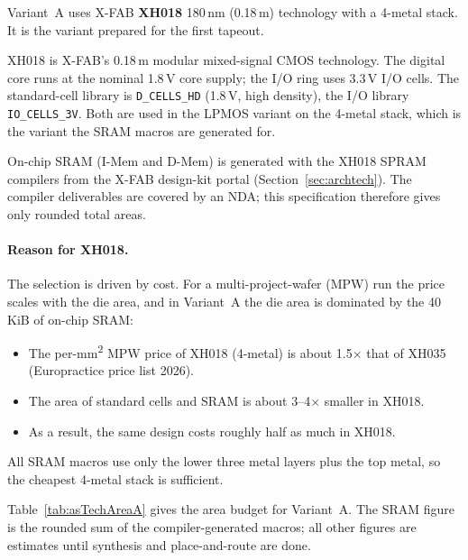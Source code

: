 Variant~A uses X-FAB \textbf{XH018} 180\,nm (0.18\,\textmu m) technology with a
4-metal stack. It is the variant prepared for the first tapeout.

XH018 is X-FAB's 0.18\,\textmu m modular mixed-signal CMOS technology.
The digital core runs at the nominal 1.8\,V core supply; the I/O ring uses
3.3\,V I/O cells.
The standard-cell library is \texttt{D\_CELLS\_HD} (1.8\,V, high density),
the I/O library \texttt{IO\_CELLS\_3V}. Both are used in the LPMOS variant
on the 4-metal stack, which is the variant the SRAM macros are generated for.

On-chip SRAM (I-Mem and D-Mem) is generated with the XH018 SPRAM compilers
from the X-FAB design-kit portal (Section~\ref{sec:archtech}).
The compiler deliverables are covered by an NDA; this specification therefore
gives only rounded total areas.

\paragraph{Reason for XH018.}
The selection is driven by cost. For a multi-project-wafer (MPW) run the price
scales with the die area, and in Variant~A the die area is dominated by the
40\,KiB of on-chip SRAM:

\begin{itemize}
  \item The per-mm\textsuperscript{2} MPW price of XH018 (4-metal) is about
    1.5$\times$ that of XH035 (Europractice price list 2026).
  \item The area of standard cells and SRAM is about 3--4$\times$ smaller in XH018.
  \item As a result, the same design costs roughly half as much in XH018.
\end{itemize}

All SRAM macros use only the lower three metal layers plus the top metal, so
the cheapest 4-metal stack is sufficient.

Table~\ref{tab:asTechAreaA} gives the area budget for Variant~A.
The SRAM figure is the rounded sum of the compiler-generated macros; all
other figures are estimates until synthesis and place-and-route are done.

